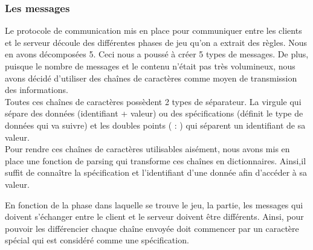 \documentclass[a4paper,11pt]{article}
\begin{document}
\subsubsection{Les messages} 

Le protocole de communication mis en place pour communiquer entre les clients et le serveur découle des différentes phases de jeu qu’on a extrait des règles. Nous en avons décomposées 5. Ceci nous a poussé à créer 5 types de messages. De plus, puisque le nombre de messages et le contenu n’était pas très volumineux, nous avons décidé d’utiliser des chaînes de caractères comme moyen de transmission des informations. \\

	Toutes ces chaînes de caractères possèdent 2 types de séparateur. La virgule qui sépare des données (identifiant + valeur) ou des spécifications (définit le type de données qui va suivre) et les doubles points ( : ) qui séparent un identifiant de sa valeur. \\
	
	Pour rendre ces chaînes de caractères utilisables aisément, nous avons mis en place une fonction de parsing qui transforme ces chaînes en dictionnaires. Ainsi,il suffit de connaître la spécification et l’identifiant d’une donnée afin d’accéder à sa valeur.

En fonction de la phase dans laquelle se trouve le jeu, la partie, les messages qui doivent s’échanger entre le client et le serveur doivent être différents. Ainsi, pour pouvoir les différencier chaque chaîne envoyée doit commencer par un caractère spécial qui est considéré comme une spécification. \\
\end{document}
